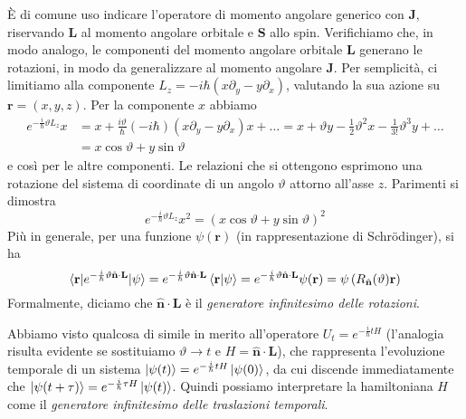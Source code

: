 È di comune uso indicare l'operatore di momento angolare generico con $\textbf{J}$, riservando $\textbf{L}$ al momento angolare orbitale e $\textbf{S}$ allo spin. 
Verifichiamo che, in modo analogo, le  componenti del momento angolare orbitale $\textbf{L}$ generano le rotazioni, in modo da generalizzare al momento angolare $\textbf{J}$. Per semplicità, ci limitiamo alla componente $L_z=-i\hbar\left(x\partial_y-y\partial_x\right)$, valutando la sua azione su $\textbf{r}=(x,y,z)$. Per la componente $x$ abbiamo
\begin{equation}\begin{split}
e^{-\frac{i}{\hbar}\vartheta L_z}x &= x+\frac{i\vartheta}{\hbar}(-i\hbar)(x\partial_y-y\partial_x)x+\dots = x+\vartheta y-\frac{1}{2}\vartheta^2 x-\frac{1}{3!}\vartheta^3 y+\dots \\
&=x\cos\vartheta+y\sin\vartheta
\end{split}\end{equation}
e così per le altre componenti. Le relazioni che si ottengono esprimono una rotazione del sistema di coordinate di un angolo $\vartheta$ attorno all'asse $z$. Parimenti si dimostra
\begin{equation}
e^{-\frac{i}{\hbar}\vartheta L_z}x^2=\left(x\cos\vartheta+y\sin\vartheta\right)^2
\end{equation}
Più in generale, per una funzione $\psi(\textbf{r})$ (in rappresentazione di Schr\"odinger), si ha
\begin{equation}
\braket{\textbf{r}|e^{-\frac{i}{\hbar}\vartheta\hat{\textbf{n}}\cdot\textbf{L}}|\psi}=e^{-\frac{i}{\hbar}\vartheta\hat{\textbf{n}}\cdot\textbf{L}}\braket{\textbf{r}|\psi}=e^{-\frac{i}{\hbar}\vartheta\hat{\textbf{n}}\cdot\textbf{L}}\psi(\textbf{r})=\psi\left(R_{\hat{\textbf{n}}}(\vartheta)\textbf{r}\right)
\end{equation}
Formalmente, diciamo che $\hat{\textbf{n}}\cdot\textbf{L}$ è il \textit{generatore infinitesimo delle rotazioni}.

Abbiamo visto qualcosa di simile in merito all'operatore $U_t=e^{-\frac{i}{\hbar}tH}$ (l'analogia risulta evidente se sostituiamo $\vartheta\to t$ e $H=\hat{\textbf{n}}\cdot\textbf{L}$), che rappresenta l'evoluzione temporale di un sistema $\ket{\psi(t)}=e^{-\frac{i}{\hbar}tH}\ket{\psi(0)}$, da cui discende immediatamente che $\ket{\psi(t+\tau)}=e^{-\frac{i}{\hbar}\tau H}\ket{\psi(t)}$. Quindi possiamo interpretare la hamiltoniana $H$ come il \textit{generatore infinitesimo delle traslazioni temporali}.

